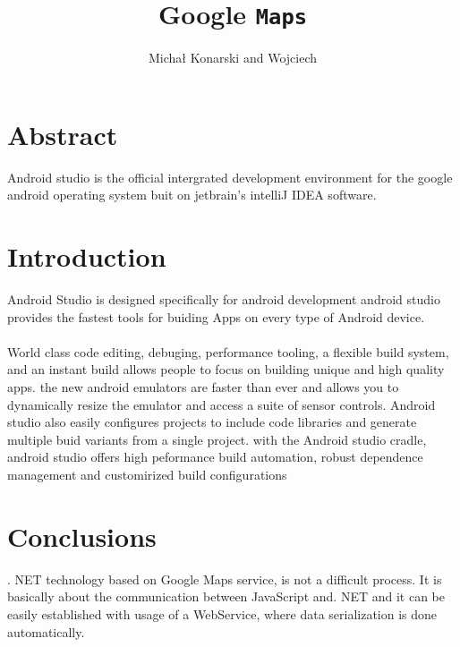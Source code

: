\documentclass[a4paper,10pt]{article}
\title{Google \texttt{Maps} }
\author{Michał Konarski and Wojciech}
\begin{document}
	
	\maketitle
	

\section*{Abstract}
Android studio is the official intergrated development environment for the google android operating system buit on jetbrain's intelliJ IDEA software.\cite{huddersfieldtpsamson}


\section*{Introduction}
Android Studio is designed specifically for android development android studio provides the fastest tools for buiding Apps on every type of Android device. 
\paragraph{}

World class code editing, debuging, performance tooling, a flexible build system, and an instant build allows people to focus on building unique and high quality apps. the new android emulators are faster than ever and allows you to dynamically resize the emulator and access a suite of sensor controls. Android studio also easily configures projects to include code libraries and generate multiple buid variants from a single project. with the Android studio cradle, android studio offers high peformance build automation, robust dependence management and customirized build configurations

\section*{Conclusions}
.\cite{Turk.J} NET technology based on Google Maps service, is not a difficult process. It is basically about the communication between JavaScript\cite{TownsedBaptiste} and. NET and it can be easily established with usage of a WebService, where data serialization is done automatically.\cite{Online}


	
	\medskip
	
	
	
\end{document}
